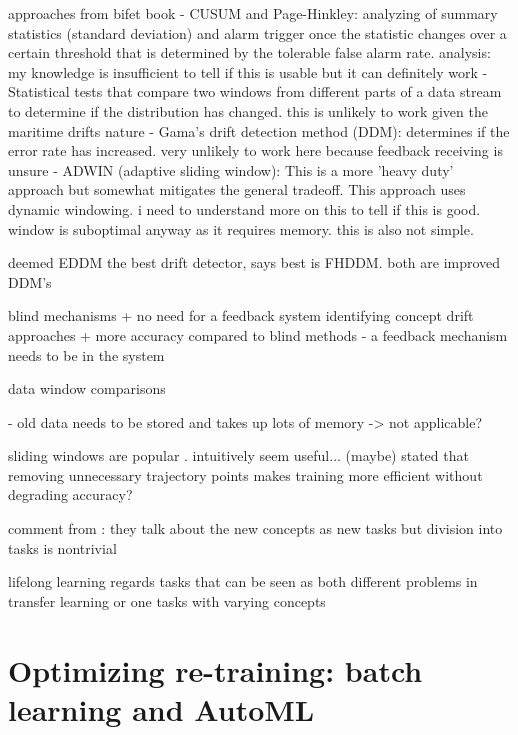 approaches from bifet book
- CUSUM and Page-Hinkley: analyzing of summary statistics (standard deviation) and alarm trigger once the statistic changes over a certain threshold that is determined by the tolerable false alarm rate. analysis: my knowledge is insufficient to tell if this is usable but it can definitely work
- Statistical tests that compare two windows from different parts of a data stream to determine if the distribution has changed. this is unlikely to work given the maritime drifts nature
- Gama's drift detection method (DDM): determines if the error rate has increased. very unlikely to work here because feedback receiving is unsure
- ADWIN (adaptive sliding window): This is a more 'heavy duty' approach but somewhat mitigates the general tradeoff. This approach uses dynamic windowing. i need to understand more on this to tell if this is good. window is suboptimal anyway as it requires memory. this is also not simple.

\cite{celik_adaptation_2021} deemed EDDM the best drift detector, \cite{madrid_towards_2019} says best is FHDDM. both are improved DDM's

blind mechanisms
+ no need for a feedback system
identifying concept drift approaches
+ more accuracy compared to blind methods \cite{conceptdriftsurvey}
- a feedback mechanism needs to be in the system

data window comparisons

- old data needs to be stored and takes up lots of memory \cite{conceptdriftsurvey} -> not applicable?

sliding windows are popular \cite{celik_adaptation_2021}. intuitively seem useful... \cite{maritimeinformatics} (maybe) stated that removing unnecessary trajectory points makes training more efficient without degrading accuracy?


comment from \cite{celik_adaptation_2021}: they talk about the new concepts as new tasks but division into tasks is nontrivial

lifelong learning regards tasks that can be seen as both different problems in transfer learning or one tasks with varying concepts \cite{madrid_towards_2019}

\section{Optimizing re-training: batch learning and AutoML}


